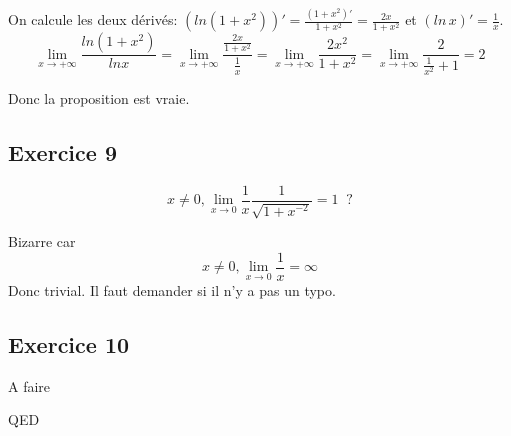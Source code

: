 \documentclass[]{book}
\theoremstyle{definition}
\begin{document}
On calcule les deux d\'eriv\'es: $(ln(1+x^2))' = \frac{(1+x^2)'}{1+x^2} = \frac{2x}{1+x^2}$ et $(ln\, x)' = \frac{1}{x}$.
$$ \lim_{x \to +\infty} \frac{ln(1+x^2)}{ln x} = \lim_{x \to +\infty} \frac{\frac{2x}{1+x^2}}{\frac{1}{x}} = \lim_{x \to +\infty} \frac{2x^2}{1+x^2} = \lim_{x \to +\infty} \frac{2}{\frac{1}{x^2}+1} = 2$$


Donc la proposition est vraie.

\subsection*{Exercice 9}
$$x \neq 0, \lim_{x \to 0} \frac{1}{x} \frac{1}{\sqrt{1+x^{-2}}}= 1 \;\;?$$

Bizarre car
$$x \neq 0, \lim_{x \to 0} \frac{1}{x} = \infty$$
Donc trivial. Il faut demander si il n'y a pas un typo.


\subsection*{Exercice 10}
A faire


QED
\end{document}

